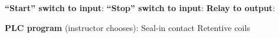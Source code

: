 \vskip 20pt

\noindent
{\bf ``Start'' switch to input}: \underbar{\hskip 20pt} \hskip 30pt {\bf ``Stop'' switch to input}: \underbar{\hskip 20pt} \hskip 30pt {\bf Relay to output}: \underbar{\hskip 20pt}

\vskip 20pt

\noindent
{\bf PLC program} (instructor chooses): \hskip 20pt \underbar{\hskip 20pt} Seal-in contact \hskip 20pt \underbar{\hskip 20pt} Retentive coils



\vfil

\eject

















